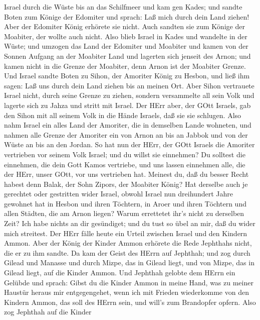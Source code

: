 Israel durch die Wüste bis an das Schilfmeer und kam gen Kades;
 und sandte Boten zum Könige der Edomiter und sprach: Laß
mich durch dein Land ziehen! Aber der Edomiter König erhörete sie nicht.
Auch sandten sie zum Könige der Moabiter, der wollte auch nicht. Also
blieb Israel in Kades  und wandelte in der Wüste; und
umzogen das Land der Edomiter und Moabiter und kamen von der Sonnen
Aufgang an der Moabiter Land und lagerten sich jenseit des Arnon; und
kamen nicht in die Grenze der Moabiter, denn Arnon ist der Moabiter
Grenze.  Und Israel sandte Boten zu Sihon, der Amoriter
König zu Hesbon, und ließ ihm sagen: Laß uns durch dein Land ziehen bis
an meinen Ort.  Aber Sihon vertrauete Israel nicht, durch
seine Grenze zu ziehen, sondern versammelte all sein Volk und lagerte
sich zu Jahza und stritt mit Israel.  Der HErr aber, der
GOtt Israels, gab den Sihon mit all seinem Volk in die Hände Israels,
daß sie sie schlugen. Also nahm Israel ein alles Land der Amoriter, die
in demselben Lande wohneten,  und nahmen alle Grenze der
Amoriter ein von Arnon an bis an Jabbok und von der Wüste an bis an den
Jordan.  So hat nun der HErr, der GOtt Israels die Amoriter
vertrieben vor seinem Volk Israel; und du willst sie einnehmen?
 Du solltest die einnehmen, die dein Gott Kamos vertriebe,
und uns lassen einnehmen alle, die der HErr, unser GOtt, vor uns
vertrieben hat.  Meinest du, daß du besser Recht habest
denn Balak, der Sohn Zipors, der Moabiter König? Hat derselbe auch je
gerechtet oder gestritten wider Israel,  obwohl Israel nun
dreihundert Jahre gewohnet hat in Hesbon und ihren Töchtern, in Aroer
und ihren Töchtern und allen Städten, die am Arnon liegen? Warum
errettetet ihr's nicht zu derselben Zeit?  Ich habe nichts
an dir gesündiget; und du tust so übel an mir, daß du wider mich
streitest. Der HErr fälle heute ein Urteil zwischen Israel und den
Kindern Ammon.  Aber der König der Kinder Ammon erhörete
die Rede Jephthahs nicht, die er zu ihm sandte.  Da kam der
Geist des HErrn auf Jephthah; und zog durch Gilead und Manasse und durch
Mizpe, das in Gilead liegt, und von Mizpe, das in Gilead liegt, auf die
Kinder Ammon.  Und Jephthah gelobte dem HErrn ein Gelübde
und sprach: Gibst du die Kinder Ammon in meine Hand,  was
zu meiner Haustür heraus mir entgegengehet, wenn ich mit Frieden
wiederkomme von den Kindern Ammon, das soll des HErrn sein, und will's
zum Brandopfer opfern.  Also zog Jephthah auf die Kinder
